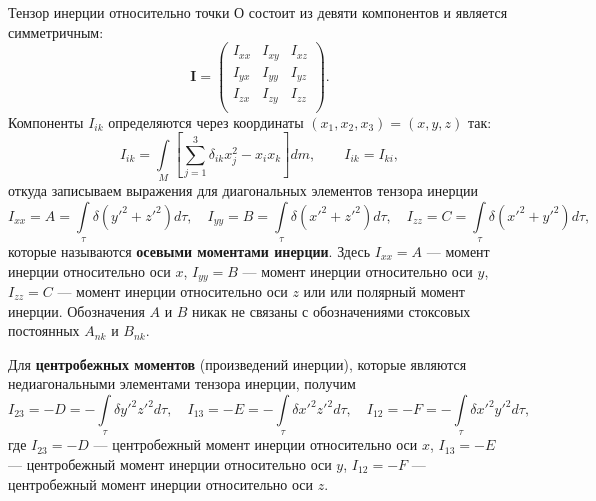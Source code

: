 \documentclass[11pt, a4paper,addpoints]{exam}
\theoremstyle{remark}
\begin{document}
    Тензор инерции относительно точки О состоит из девяти компонентов и является симметричным:
    \begin{equation*}
        \pmb I = \begin{pmatrix}
            I_{xx} & I_{xy} & I_{xz} \\
            I_{yx} & I_{yy} & I_{yz} \\
            I_{zx} & I_{zy} & I_{zz} \\
        \end{pmatrix}.
    \end{equation*}
    Компоненты $I_{ik}$ определяются через координаты $(x_1, x_2, x_3) = (x, y, z)$ так:
    \begin{equation*}
        I_{ik} = \int\limits_M 
        \left[ \sum\limits_{j = 1}^{3} \delta_{ik} x_j^2 - x_i x_k \right] dm, \qquad
        I_{ik} = I_{ki},
    \end{equation*}
    откуда записываем  выражения для диагональных элементов тензора инерции
    \begin{equation*}
        I_{xx} = A = \int\limits_\tau \delta \left( y'^2 + z'^2 \right) d\tau, \quad
        I_{yy} = B = \int\limits_\tau \delta \left( x'^2 + z'^2 \right) d\tau, \quad
        I_{zz} = C = \int\limits_\tau \delta \left( x'^2 + y'^2 \right) d\tau, \quad
    \end{equation*}
    которые называются \textbf{осевыми моментами инерции}. Здесь $I_{xx} = A$ --- момент инерции относительно
    оси $x$, $I_{yy} = B$ --- момент инерции относительно оси $y$,
    $I_{zz} = C$ --- момент инерции относительно оси $z$ или или полярный момент инерции.
    Обозначения $A$ и $B$ никак не связаны с обозначениями стоксовых постоянных $A_{nk}$ и
    $B_{nk}$.

    Для  \textbf{центробежных моментов} (произведений инерции), которые являются недиагональными элементами
    тензора инерции, получим
    \begin{equation*}
        I_{23} = -D = -\int\limits_\tau \delta y'^2 z'^2 d\tau, \quad
        I_{13} = -E = -\int\limits_\tau \delta x'^2 z'^2 d\tau, \quad
        I_{12} = -F = -\int\limits_\tau \delta x'^2 y'^2 d\tau, \quad
    \end{equation*}
    где $I_{23} = -D$ --- центробежный момент инерции относительно оси $x$,
    $I_{13} = -E$ --- центробежный момент инерции относительно оси $y$,
    $I_{12} = -F$ --- центробежный момент инерции относительно оси $z$.
\end{document}
